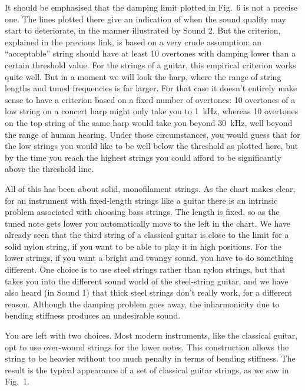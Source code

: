 
  It should be emphasised that the damping limit plotted in Fig.\ 6 is not a 
  precise one. The lines plotted there give an indication of when the sound 
  quality may start to deteriorate, in the manner illustrated by Sound 2. But 
  the criterion, explained in the previous link, is based on a very crude 
  assumption: an ``acceptable'' string should have at least 10 overtones with 
  damping lower than a certain threshold value. For the strings of a guitar, 
  this empirical criterion works quite well. But in a moment we will look the 
  harp, where the range of string lengths and tuned frequencies is far larger. 
  For that case it doesn't entirely make sense to have a criterion based on a 
  fixed number of overtones: 10 overtones of a low string on a concert harp 
  might only take you to 1~kHz, whereas 10 overtones on the top string of the 
  same harp would take you beyond 30~kHz, well beyond the range of human 
  hearing. Under those circumstances, you would guess that for the low strings 
  you would like to be well below the threshold as plotted here, but by the 
  time you reach the highest strings you could afford to be significantly above 
  the threshold line. 

  All of this has been about solid, monofilament strings. As the chart makes 
  clear, for an instrument with fixed-length strings like a guitar there is an 
  intrinsic problem associated with choosing bass strings. The length is fixed, 
  so as the tuned note gets lower you automatically move to the left in the 
  chart. We have already seen that the third string of a classical guitar is 
  close to the limit for a solid nylon string, if you want to be able to play 
  it in high positions. For the lower strings, if you want a bright and twangy 
  sound, you have to do something different. One choice is to use steel strings 
  rather than nylon strings, but that takes you into the different sound world 
  of the steel-string guitar, and we have also heard (in Sound 1) that thick 
  steel strings don't really work, for a different reason. Although the damping 
  problem goes away, the inharmonicity due to bending stiffness produces an 
  undesirable sound. 

  You are left with two choices. Most modern instruments, like the classical 
  guitar, opt to use over-wound strings for the lower notes. This construction 
  allows the string to be heavier without too much penalty in terms of bending 
  stiffness. The result is the typical appearance of a set of classical guitar 
  strings, as we saw in Fig.\ 1. 

